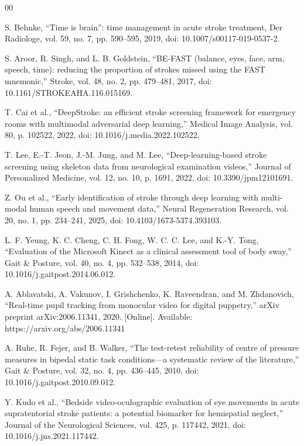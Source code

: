 \documentclass[conference]{IEEEtran}
\begin{document}


\begin{thebibliography}{00}

S. Behnke, ``Time is brain'': time management in acute stroke treatment,
Der Radiologe, vol. 59, no. 7, pp. 590--595, 2019,
doi: 10.1007/s00117-019-0537-2.

S. Aroor, R. Singh, and L. B. Goldstein,
``BE-FAST (balance, eyes, face, arm, speech, time): reducing the proportion of strokes missed using the FAST mnemonic,''
Stroke, vol. 48, no. 2, pp. 479--481, 2017,
doi: 10.1161/STROKEAHA.116.015169.

T. Cai et al.,
``DeepStroke: an efficient stroke screening framework for emergency rooms with multimodal adversarial deep learning,''
Medical Image Analysis, vol. 80, p. 102522, 2022,
doi: 10.1016/j.media.2022.102522.

T. Lee, E.-T. Jeon, J.-M. Jung, and M. Lee,
``Deep-learning-based stroke screening using skeleton data from neurological examination videos,''
Journal of Personalized Medicine, vol. 12, no. 10, p. 1691, 2022,
doi: 10.3390/jpm12101691.

Z. Ou et al.,
``Early identification of stroke through deep learning with multi-modal human speech and movement data,''
Neural Regeneration Research, vol. 20, no. 1, pp. 234--241, 2025,
doi: 10.4103/1673-5374.393103.

L. F. Yeung, K. C. Cheng, C. H. Fong, W. C. C. Lee, and K.-Y. Tong,
``Evaluation of the Microsoft Kinect as a clinical assessment tool of body sway,''
Gait \& Posture, vol. 40, no. 4, pp. 532--538, 2014,
doi: 10.1016/j.gaitpost.2014.06.012.

A. Ablavatski, A. Vakunov, I. Grishchenko, K. Raveendran, and M. Zhdanovich,
``Real-time pupil tracking from monocular video for digital puppetry,''
arXiv preprint arXiv:2006.11341, 2020.
[Online]. Available: https://arxiv.org/abs/2006.11341

A. Ruhe, R. Fejer, and B. Walker,
``The test-retest reliability of centre of pressure measures in bipedal static task conditions---a systematic review of the literature,''
Gait \& Posture, vol. 32, no. 4, pp. 436--445, 2010,
doi: 10.1016/j.gaitpost.2010.09.012.

Y. Kudo et al.,
``Bedside video-oculographic evaluation of eye movements in acute supratentorial stroke patients: a potential biomarker for hemispatial neglect,''
Journal of the Neurological Sciences, vol. 425, p. 117442, 2021,
doi: 10.1016/j.jns.2021.117442.


\end{thebibliography}
\end{document}
